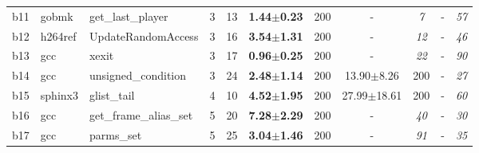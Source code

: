 \begin{longtable}{|l|l|l|l|l||c|c|c|c|c|c|}
\\
b11&gobmk&get\_last\_player&3&13&\textbf{1.44$\pm$0.23} & 200 &- & \textit{7 }&- & \textit{57 }
\\
b12&h264ref&UpdateRandomAccess&3&16&\textbf{3.54$\pm$1.31} & 200 &- & \textit{12 }&- & \textit{46 }
\\
b13&gcc&xexit&3&17&\textbf{0.96$\pm$0.25} & 200 &- & \textit{22 }&- & \textit{90 }
\\
b14&gcc&unsigned\_condition&3&24&\textbf{2.48$\pm$1.14} & 200 &13.90$\pm$8.26 & 200 &- & \textit{27 }
\\
b15&sphinx3&glist\_tail&4&10&\textbf{4.52$\pm$1.95} & 200 &27.99$\pm$18.61 & 200 &- & \textit{60 }
\\
b16&gcc&get\_frame\_alias\_set&5&20&\textbf{7.28$\pm$2.29} & 200 &- & \textit{40 }&- & \textit{30 }
\\
b17&gcc&parms\_set&5&25&\textbf{3.04$\pm$1.46} & 200 &- & \textit{91 }&- & \textit{35 }
\\
\hline
\end{longtable}
